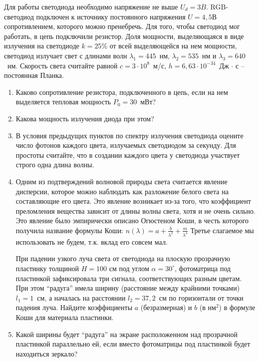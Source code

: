 
Для работы светодиода необходимо напряжение не выше $U_d = 3B$. RGB-светодиод подключен к источнику постоянного 
напряжения $U = 4,5$В сопротивлением, которого можно пренебречь. Для того, чтобы светодиод мог работать, в цепь 
подключили резистор. Доля мощности, выделяющаяся в виде излучения на светодиоде $k = 25\%$ от всей выделяющейся на нем мощности, светодиод излучает 
свет с длинами волн $\lambda_1=445$~нм, $\lambda_2=535$~нм и $\lambda_3=640$~нм. Скорость света считайте равной 
$c=3 \cdot 10^8$~м/с, $h = 6,63 \cdot 10^{-34}$~Дж $\cdot$ с – постоянная Планка.

\begin{enumerate}
    \item Каково сопротивление резистора, подключенного в цепь, если на нем выделяется тепловая мощность $P_0 = 30$~мВт?
    \item Какова мощность излучения диода при этом?
    \item В условия предыдущих пунктов по спектру излучения светодиода оцените число фотонов каждого цвета, излучаемых светодиодом за секунду. Для простоты считайте, что в создании каждого цвета у светодиода участвует строго одна длина волны.
    \item Одним из подтверждений волновой природы света считается явление дисперсии, которое можно наблюдать 
    как разложение белого света на составляющие его цвета. Это явление возникает из-за того, что коэффициент 
    преломления вещества зависит от длины волны света, хотя и не очень сильно. Это явление было эмпирически 
    описано Огюстеном Коши, в честь которого получила название формулы Коши: $n(\lambda)=a+\frac{b}{\lambda^2} + \frac{m}{\lambda^4}$  
    Третье слагаемое мы использовать не будем, т.к. вклад его совсем мал.
    
    При падении узкого луча света от светодиода на плоскую прозрачную пластинку толщиной $H = 100$ см под углом 
    $\alpha = 30^{\circ}$, фотоматрица под пластинкой зафиксировала три сигнала, соответствующих разным цветам. 
    При этом “радуга” имела ширину (расстояние между крайними точками) $l_1 = 1$~см, а началась на расстоянии 
    $l_2 = 37,2$~см по горизонтали от точки падения луча. Найдите коэффициенты $a$ (безразмерная) и $b$ (в нм$^2$) в 
    формуле Коши для материала пластинки.
    \item Какой ширины будет “радуга” на экране расположенном над прозрачной пластинкой параллельно ей, если вместо фотоматрицы под пластинкой будет находиться зеркало?
\end{enumerate}